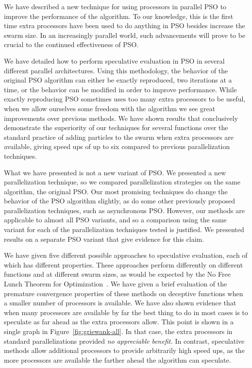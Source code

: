 \documentclass[smallcondensed]{svjour3}
\newcommand{\fig}[1]{Figure~\ref{fig:#1}}
\begin{document}
We have described a new technique for using processors in parallel PSO to
improve the performance of the algorithm.  To our knowledge, this is the first
time extra processors have been used to do anything in PSO besides increase the
swarm size.  In an increasingly parallel world, such advancements will prove to
be crucial to the continued effectiveness of PSO.

We have detailed how to perform speculative evaluation in PSO in several
different parallel architectures.  Using this methodology, the behavior of the
original PSO algorithm can either be exactly reproduced, two iterations at a
time, or the behavior can be modified in order to improve performance.  While
exactly reproducing PSO sometimes uses too many extra processors to be useful,
when we allow ourselves some freedom with the algorithm we see great
improvements over previous methods.  We have shown results that conclusively
demonstrate the superiority of our techniques for several functions over the
standard practice of adding particles to the swarm when extra processors are
available, giving speed ups of up to six compared to previous parallelization
techniques.

What we have presented is not a new variant of PSO.  We presented a new
parallelization technique, so we compared parallelization strategies on the
same algorithm, the original PSO.  Our most promising techniques do change the
behavior of the PSO algorithm slightly, as do some other previously proposed
parallelization techniques, such as asynchronous PSO.  However, our methods are
applicable to almost all PSO variants, and so a comparison using the same
variant for each of the parallelization techniques tested is justified.  We
presented results on a separate PSO variant that give evidence for this claim.

We have given five different possible approaches to speculative evaluation,
each of which has different properties.  These approaches perform differently
on different functions and at different swarm sizes, as would be expected by
the No Free Lunch Theorem for
Optimization~\citep{wolpert-1997-nfl-for-optimization}.  We have given a brief
evaluation of the premature convergence properties of these methods on
deceptive functions when a smaller number of processors is available.  We have
also shown evidence that when many processors are available by far the best
thing to do in most cases is to speculate as far ahead as the extra processors
allow.  This point is shown in a single graph in \fig{griewank-all}.  In that
case, the extra processors in standard parallelizations provided \emph{no
appreciable benefit.}  In contrast, speculative methods allow additional
processors to provide arbitrarily high speed ups, as the more processors are
available the farther ahead the algorithm can speculate.
\end{document}
